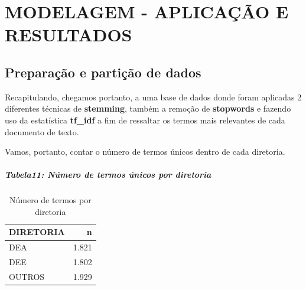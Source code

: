 \documentclass[]{article}
\newenvironment{Shaded}{\begin{snugshade}}{\end{snugshade}}
\newcommand{\KeywordTok}[1]{\textcolor[rgb]{0.13,0.29,0.53}{\textbf{#1}}}
\newcommand{\DataTypeTok}[1]{\textcolor[rgb]{0.13,0.29,0.53}{#1}}
\newcommand{\StringTok}[1]{\textcolor[rgb]{0.31,0.60,0.02}{#1}}
\newcommand{\OperatorTok}[1]{\textcolor[rgb]{0.81,0.36,0.00}{\textbf{#1}}}
\newcommand{\NormalTok}[1]{#1}
\let\oldsubparagraph\subparagraph
\renewcommand{\subparagraph}[1]{\oldsubparagraph{#1}\mbox{}}
\begin{document}
\section{MODELAGEM - APLICAÇÃO E
RESULTADOS}\label{modelagem---aplicacao-e-resultados}

\subsection{Preparação e partição de
dados}\label{preparacao-e-particao-de-dados}

Recapitulando, chegamos portanto, a uma base de dados donde foram
aplicadas 2 diferentes técnicas de \textbf{stemming}, também a remoção
de \textbf{stopwords} e fazendo uso da estatística \textbf{tf\_idf} a
fim de ressaltar os termos mais relevantes de cada documento de texto.

Vamos, portanto, contar o número de termos únicos dentro de cada
diretoria.

\subparagraph{Tabela11: Número de termos únicos por
diretoria}\label{tabela11-numero-de-termos-unicos-por-diretoria}

\begin{Shaded}
\end{Shaded}

\begin{table}[!h]

\caption{\label{tab:unnamed-chunk-68}Número de termos por diretoria}
\centering
\begin{tabular}{lr}
\toprule
DIRETORIA & n\\
\midrule
\rowcolor{gray!6}  DEA & 1.821\\
DEE & 1.802\\
\rowcolor{gray!6}  OUTROS & 1.929\\
\bottomrule
\end{tabular}
\end{table}
\end{document}
